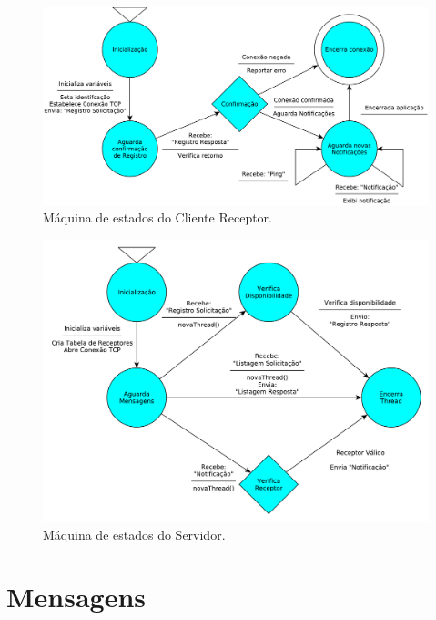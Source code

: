 \documentclass[12pt]{article}
\begin{document}
\begin{figure}%
	\centering
	\includegraphics[width=1\textwidth]{images/Protocolo_Cliente_Receptor.pdf}
	\caption{Máquina de estados do Cliente Receptor.}
	\label{fig:Receptor}
\end{figure}

\begin{figure}%
	\centering
	\includegraphics[width=1\textwidth]{images/Protocolo_Servidor.pdf}
	\caption{Máquina de estados do Servidor.}
	\label{fig:Servidor}
\end{figure}

\section{Mensagens}\label{sec:Mensagens}
\end{document}
